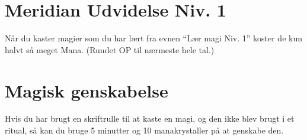 \section{Meridian Udvidelse Niv. 1}
Når du kaster magier som du har lært fra evnen “Lær magi Niv. 1” koster de kun halvt så meget Mana. (Rundet OP til nærmeste hele tal.)

\section{Magisk genskabelse}
Hvis du har brugt en skriftrulle til at kaste en magi, og den ikke blev brugt i et ritual, så kan du bruge 5 minutter og 10 manakrystaller på at genskabe den. 
